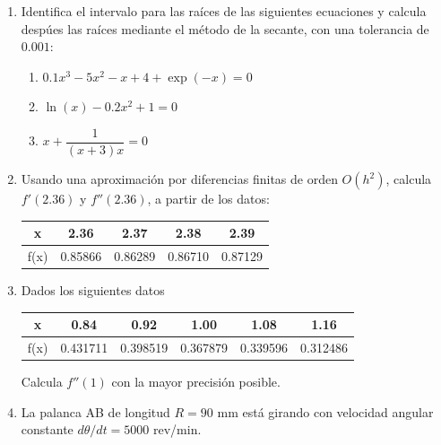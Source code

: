 \documentclass[11pt]{article}
\begin{document}
\begin{enumerate}
	\item Identifica el intervalo para las raíces de las siguientes ecuaciones y calcula despúes las raíces mediante el método de la secante, con una tolerancia de $0.001$:
	\begin{enumerate}
		\item $0.1 x^{3} - 5 x^{2} - x + 4 + \exp(-x) = 0 $
		\item $\ln(x) -0.2 x^{2} + 1 = 0$
		\item $x + \dfrac{1}{(x+3)x}= 0$
	\end{enumerate}
\item Usando una aproximaci\'{o}n por diferencias finitas de orden $O(h^{2})$, calcula $f'(2.36)$ y $f''(2.36)$, a partir de los datos:
\begin{center}
\begin{tabular}{c | c | c | c | c}
x & 2.36 & 2.37 & 2.38 & 2.39 \\ \hline
f(x) & 0.85866 & 0.86289 & 0.86710 & 0.87129
\end{tabular}
\end{center}
\item Dados los siguientes datos
\begin{center}
\begin{tabular}{c | c | c | c | c | c }
x & 0.84 & 0.92 & 1.00 & 1.08 & 1.16 \\ \hline
f(x) & 0.431711 & 0.398519 & 0.367879 & 0.339596 & 0.312486
\end{tabular}
\end{center}
Calcula $f''(1)$ con la mayor precisi\'{o}n posible.
\item La palanca AB de longitud $R=90$ mm est\'{a} girando con velocidad angular constante $d\theta/dt= 5000$ rev/min.
\begin{center}
\end{center}
\end{enumerate}
\end{document}
